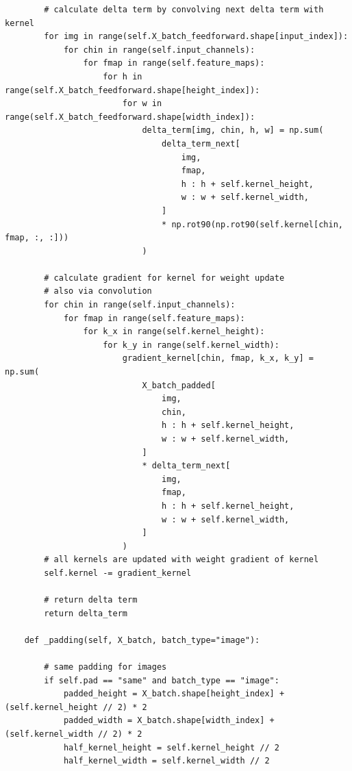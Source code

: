 \documentclass[%
oneside,                 %
final,                   %
10pt]{article}
\begin{document}
\begin{verbatim}
        # calculate delta term by convolving next delta term with kernel
        for img in range(self.X_batch_feedforward.shape[input_index]):
            for chin in range(self.input_channels):
                for fmap in range(self.feature_maps):
                    for h in range(self.X_batch_feedforward.shape[height_index]):
                        for w in range(self.X_batch_feedforward.shape[width_index]):
                            delta_term[img, chin, h, w] = np.sum(
                                delta_term_next[
                                    img,
                                    fmap,
                                    h : h + self.kernel_height,
                                    w : w + self.kernel_width,
                                ]
                                * np.rot90(np.rot90(self.kernel[chin, fmap, :, :]))
                            )

        # calculate gradient for kernel for weight update
        # also via convolution
        for chin in range(self.input_channels):
            for fmap in range(self.feature_maps):
                for k_x in range(self.kernel_height):
                    for k_y in range(self.kernel_width):
                        gradient_kernel[chin, fmap, k_x, k_y] = np.sum(
                            X_batch_padded[
                                img,
                                chin,
                                h : h + self.kernel_height,
                                w : w + self.kernel_width,
                            ]
                            * delta_term_next[
                                img,
                                fmap,
                                h : h + self.kernel_height,
                                w : w + self.kernel_width,
                            ]
                        )
        # all kernels are updated with weight gradient of kernel
        self.kernel -= gradient_kernel

        # return delta term
        return delta_term

    def _padding(self, X_batch, batch_type="image"):

        # same padding for images
        if self.pad == "same" and batch_type == "image":
            padded_height = X_batch.shape[height_index] + (self.kernel_height // 2) * 2
            padded_width = X_batch.shape[width_index] + (self.kernel_width // 2) * 2
            half_kernel_height = self.kernel_height // 2
            half_kernel_width = self.kernel_width // 2


\end{verbatim}
\end{document}
